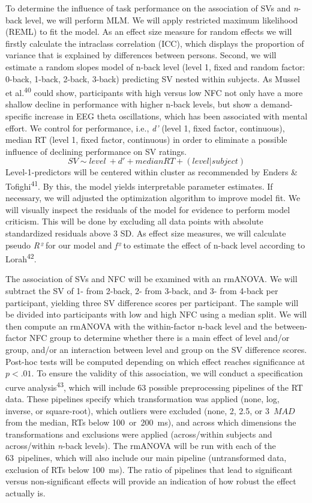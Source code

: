 \documentclass[
  man,floatsintext]{apa6}
\begin{document}
To determine the influence of task performance on the association of SVs and \emph{n}-back level, we will perform MLM.
We will apply restricted maximum likelihood (REML) to fit the model.
As an effect size measure for random effects we will firstly calculate the intraclass correlation (ICC), which displays the proportion of variance that is explained by differences between persons.
Second, we will estimate a random slopes model of n-back level (level 1, fixed and random factor: 0-back, 1-back, 2-back, 3-back) predicting SV nested within subjects.
As Mussel et al.\textsuperscript{40} could show, participants with high versus low NFC not only have a more shallow decline in performance with higher n-back levels, but show a demand-specific increase in EEG theta oscillations, which has been associated with mental effort.
We control for performance, i.e., \emph{d'} (level 1, fixed factor, continuous), median RT (level 1, fixed factor, continuous) in order to eliminate a possible influence of declining performance on SV ratings.
\[
SV \sim level\ + d' + median RT + (level|subject)
\]
Level-1-predictors will be centered within cluster as recommended by Enders \& Tofighi\textsuperscript{41}.
By this, the model yields interpretable parameter estimates.
If necessary, we will adjusted the optimization algorithm to improve model fit.
We will visually inspect the residuals of the model for evidence to perform model criticism.
This will be done by excluding all data points with absolute standardized residuals above 3 SD.
As effect size measures, we will calculate pseudo \emph{R²} for our model and \emph{f²} to estimate the effect of n-back level according to Lorah\textsuperscript{42}.

The association of SVs and NFC will be examined with an rmANOVA.
We will subtract the SV of 1- from 2-back, 2- from 3-back, and 3- from 4-back per participant, yielding three SV difference scores per participant.
The sample will be divided into participants with low and high NFC using a median split.
We will then compute an rmANOVA with the within-factor n-back level and the between-factor NFC group to determine whether there is a main effect of level and/or group, and/or an interaction between level and group on the SV difference scores.
Post-hoc tests will be computed depending on which effect reaches significance at \(p<.01\).
To ensure the validity of this association, we will conduct a specification curve analysis\textsuperscript{43}, which will include 63 possible preprocessing pipelines of the RT data.
These pipelines specify which transformation was applied (none, log, inverse, or square-root), which outliers were excluded (none, 2, 2.5, or 3~\(MAD\) from the median, RTs below 100~or~200~ms), and across which dimensions the transformations and exclusions were applied (across/within subjects and across/within \emph{n}-back levels).
The rmANOVA will be run with each of the 63~pipelines, which will also include our main pipeline (untransformed data, exclusion of RTs below 100~ms).
The ratio of pipelines that lead to significant versus non-significant effects will provide an indication of how robust the effect actually is.
\end{document}
